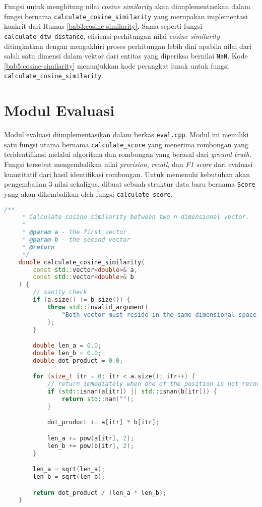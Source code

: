 Fungsi untuk menghitung nilai \textit{cosine similarity} akan diimplementasikan dalam fungsi bernama \texttt{calculate\_cosine\_similarity} yang merupakan implementasi konkrit dari Rumus \ref{bab3:cosine-similarity}. Sama seperti fungsi \texttt{calculate\_dtw\_distance}, efisiensi perhitungan nilai \textit{cosine similarity} ditingkatkan dengan mengakhiri proses perhitungan lebih dini apabila nilai dari salah satu dimensi dalam vektor dari entitas yang diperiksa bernilai \texttt{NaN}. Kode \ref{bab5:cosine-similarity} menunjukkan kode perangkat lunak untuk fungsi \texttt{calculate\_cosine\_similarity}.

\section{Modul Evaluasi}
\label{sec:impl-eval}

Modul evaluasi diimplementasikan dalam berkas \texttt{eval.cpp}. Modul ini memiliki satu fungsi utama bernama \texttt{calculate\_score} yang menerima rombongan yang teridentifikasi melalui algoritma dan rombongan yang berasal dari \textit{ground truth}. Fungsi tersebut mengembalikan nilai \textit{precision}, \textit{recall}, dan \textit{F1 score} dari evaluasi kuantitatif dari hasil identifikasi rombongan. Untuk memenuhi kebutuhan akan pengembalian 3 nilai sekaligus, dibuat sebuah struktur data baru bernama \texttt{Score} yang akan dikembalikan oleh fungsi \texttt{calculate\_score}.

\begin{lstlisting}[language=C++, caption=Implementasi fungsi \texttt{calculate\_cosine\_similarity}, label={bab5:cosine-similarity}]
    /**
     * Calculate cosine similarity between two n-dimensional vector.
     * 
     * @param a - the first vector
     * @param b - the second vector
     * @return 
     */
    double calculate_cosine_similarity(
        const std::vector<double>& a,
        const std::vector<double>& b
    ) {
        // sanity check
        if (a.size() != b.size()) {
            throw std::invalid_argument(
                "Both vector must reside in the same dimensional space."
            );
        }

        double len_a = 0.0;
        double len_b = 0.0;
        double dot_product = 0.0;

        for (size_t itr = 0; itr < a.size(); itr++) {
            // return immediately when one of the position is not recorded
            if (std::isnan(a[itr]) || std::isnan(b[itr])) {
                return std::nan("");
            }

            dot_product += a[itr] * b[itr];

            len_a += pow(a[itr], 2);
            len_b += pow(b[itr], 2);
        }

        len_a = sqrt(len_a);
        len_b = sqrt(len_b);

        return dot_product / (len_a * len_b);
    }
\end{lstlisting}


